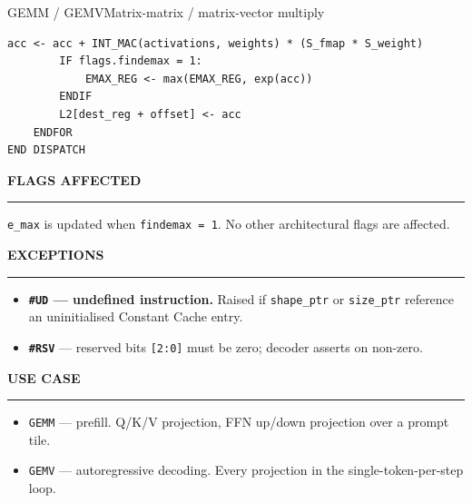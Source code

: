 \documentclass[11pt,a4paper,twoside,openany]{report}
\newcommand{\RefSection}[1]{%
  \par\medskip
  {\sffamily\bfseries\color{oceanblue}\normalsize\MakeUppercase{#1}}
  \par\vspace{-0.4em}
  {\color{oceanblue}\rule{\linewidth}{0.4pt}}\par\smallskip
}
\begin{document}
\begin{InstructionRef}{GEMM / GEMV}{Matrix-matrix / matrix-vector multiply}
\begin{lstlisting}[style=pseudo]
        acc <- acc + INT_MAC(activations, weights) * (S_fmap * S_weight)
        IF flags.findemax = 1:
            EMAX_REG <- max(EMAX_REG, exp(acc))
        ENDIF
        L2[dest_reg + offset] <- acc
    ENDFOR
END DISPATCH
\end{lstlisting}

\RefSection{Flags affected}

\texttt{e\_max} is updated when \texttt{findemax = 1}. No other
architectural flags are affected.

\RefSection{Exceptions}

\begin{itemize}[leftmargin=*, itemsep=0.2ex]
  \item \textbf{\texttt{\#UD} --- undefined instruction.} Raised if
        \texttt{shape\_ptr} or \texttt{size\_ptr} reference an
        uninitialised Constant Cache entry.
  \item \textbf{\texttt{\#RSV}} --- reserved bits \texttt{[2:0]}
        must be zero; decoder asserts on non-zero.
\end{itemize}

\RefSection{Use case}

\begin{itemize}[leftmargin=*, itemsep=0.2ex]
  \item \texttt{GEMM} --- prefill. Q/K/V projection, FFN up/down
        projection over a prompt tile.
  \item \texttt{GEMV} --- autoregressive decoding. Every projection
        in the single-token-per-step loop.
\end{itemize}
\end{InstructionRef}
\end{document}
